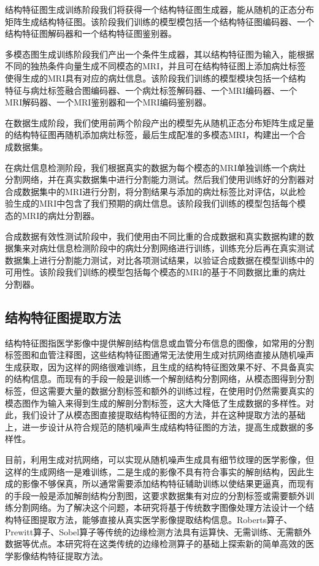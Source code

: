 \documentclass[letterpaper]{article} %
\begin{document}
结构特征图生成训练阶段我们将获得一个结构特征图生成器，能从随机的正态分布矩阵生成结构特征图。该阶段我们训练的模型模包括一个结构特征图编码器、一个结构特征图解码器和一个结构特征图鉴别器。

多模态图生成训练阶段我们产出一个条件生成器，其以结构特征图为输入，能根据不同的独热条件向量生成不同模态的MRI，并且可在结构特征图上添加病灶标签使得生成的MRI具有对应的病灶信息。该阶段我们训练的模型模块包括一个结构特征与病灶标签融合图编码器、一个病灶标签解码器、一个MRI编码器、一个MRI解码器、一个MRI鉴别器和一个MRI编码鉴别器。

在数据生成阶段，我们使用前两个阶段产出的模型先从随机正态分布矩阵生成足量的结构特征图再随机添加病灶标签，最后生成配准的多模态MRI，构建出一个合成数据集。

在病灶信息检测阶段，我们根据真实的数据为每个模态的MRI单独训练一个病灶分割网络，并在真实数据集中进行分割能力测试。然后我们使用训练好的分割器对合成数据集中的MRI进行分割，将分割结果与添加的病灶标签比对评估，以此检验生成的MRI中包含了我们预期的病灶信息。该阶段我们训练的模型包括每个模态的MRI的病灶分割器。

合成数据有效性测试阶段中，我们使用由不同比重的合成数据和真实数据构建的数据集来对病灶信息检测阶段中的病灶分割网络进行训练，训练充分后再在真实测试数据集上进行分割能力测试，对比各项测试结果，以验证合成数据在模型训练中的可用性。该阶段我们训练的模型包括每个模态的MRI的基于不同数据比重的病灶分割器。

\subsection{结构特征图提取方法}
结构特征图指医学影像中提供解剖结构信息或血管分布信息的图像，如常用的分割标签图和血管注释图，这些结构特征图通常无法使用生成对抗网络直接从随机噪声生成获取，因为这样的网络很难训练，且生成的结构特征图效果不好、不具备真实的结构信息。而现有的手段一般是训练一个解剖结构分割网络，从模态图得到分割标签，但这需要大量的数据分割标签和额外的训练过程，在使用时仍然需要真实的模态图作为输入来得到生成的解剖分割标签，这大大降低了生成数据的多样性。对此，我们设计了从模态图直接提取结构特征图的方法，并在这种提取方法的基础上，进一步设计从符合规范的随机噪声生成结构特征图的方法，提高生成数据的多样性。

目前，利用生成对抗网络，可以实现从随机噪声生成具有细节纹理的医学影像，但这样的生成网络一是难训练，二是生成的影像不具有符合事实的解剖结构，因此生成的影像不够保真，所以通常需要添加结构特征辅助训练以使结果更逼真，而现有的手段一般是添加解剖结构分割图，这要求数据集有对应的分割标签或需要额外训练分割网络。为了解决这个问题，本研究将基于传统数字图像处理方法设计一个结构特征图提取方法，能够直接从真实医学影像提取结构信息。Roberts算子、Prewitt算子、Sobel算子等传统的边缘检测方法具有运算快、无需训练、无需额外数据等优点。本研究将在这类传统的边缘检测算子的基础上探索新的简单高效的医学影像结构特征提取方法。
\end{document}
